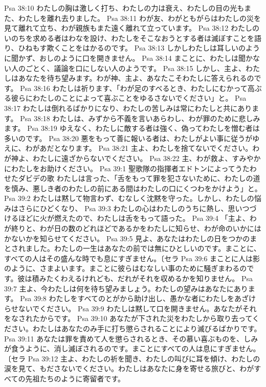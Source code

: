 Psa 38:10  わたしの胸は激しく打ち、わたしの力は衰え、わたしの目の光もまた、わたしを離れ去りました。
Psa 38:11  わが友、わがともがらはわたしの災を見て離れて立ち、わが親族もまた遠く離れて立っています。
Psa 38:12  わたしのいのちを求める者はわなを設け、わたしをそこなおうとする者は滅ぼすことを語り、ひねもす欺くことをはかるのです。
Psa 38:13  しかしわたしは耳しいのように聞かず、おしのように口を開きません。
Psa 38:14  まことに、わたしは聞かない人のごとく、議論を口にしない人のようです。
Psa 38:15  しかし、主よ、わたしはあなたを待ち望みます。わが神、主よ、あなたこそわたしに答えられるのです。
Psa 38:16  わたしは祈ります、「わが足のすべるとき、わたしにむかって高ぶる彼らにわたしのことによって喜ぶことをゆるさないでください」と。
Psa 38:17  わたしは倒れるばかりになり、わたしの苦しみは常にわたしと共にあります。
Psa 38:18  わたしは、みずから不義を言いあらわし、わが罪のために悲しみます。
Psa 38:19  ゆえなく、わたしに敵する者は強く、偽ってわたしを憎む者は多いのです。
Psa 38:20  悪をもって善に報いる者は、わたしがよい事に従うがゆえに、わがあだとなります。
Psa 38:21  主よ、わたしを捨てないでください。わが神よ、わたしに遠ざからないでください。
Psa 38:22  主、わが救よ、すみやかにわたしをお助けください。
Psa 39:1  聖歌隊の指揮者エドトンによってうたわせたダビデの歌 わたしは言った、「舌をもって罪を犯さないために、わたしの道を慎み、悪しき者のわたしの前にある間はわたしの口にくつわをかけよう」と。
Psa 39:2  わたしは黙して物言わず、むなしく沈黙を守った。しかし、わたしの悩みはさらにひどくなり、
Psa 39:3  わたしの心はわたしのうちに熱し、思いつづけるほどに火が燃えたので、わたしは舌をもって語った。
Psa 39:4  「主よ、わが終りと、わが日の数のどれほどであるかをわたしに知らせ、わが命のいかにはかないかを知らせてください。
Psa 39:5  見よ、あなたはわたしの日をつかのまとされました。わたしの一生はあなたの前では無にひとしいのです。まことに、すべての人はその盛んな時でも息にすぎません。〔セラ
Psa 39:6  まことに人は影のように、さまよいます。まことに彼らはむなしい事のために騒ぎまわるのです。彼は積みたくわえるけれども、だれがそれを収めるかを知りません。
Psa 39:7  主よ、今わたしは何を待ち望みましょう。わたしの望みはあなたにあります。
Psa 39:8  わたしをすべてのとがから助け出し、愚かな者にわたしをあざけらせないでください。
Psa 39:9  わたしは黙して口を開きません。あなたがそれをなされたからです。
Psa 39:10  あなたが下された災をわたしから取り去ってください。わたしはあなたのみ手に打ち懲らされることにより滅びるばかりです。
Psa 39:11  あなたは罪を責めて人を懲らされるとき、その慕い喜ぶものを、しみが食うように、消し滅ぼされるのです。まことにすべての人は息にすぎません。〔セラ
Psa 39:12  主よ、わたしの祈を聞き、わたしの叫びに耳を傾け、わたしの涙を見て、もださないでください。わたしはあなたに身を寄せる旅びと、わがすべての先祖たちのように寄留者です。
